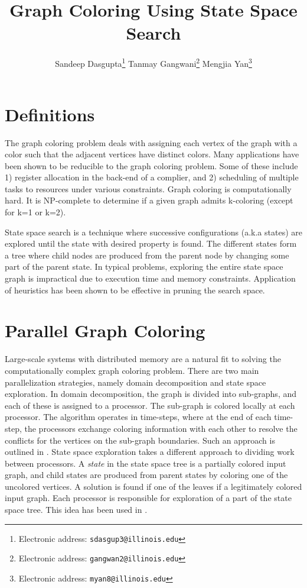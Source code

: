 \documentclass[10pt,twoside]{article}
\title{\textbf{Graph Coloring Using State Space Search}}
\author{Sandeep Dasgupta\thanks{Electronic address: \texttt{sdasgup3@illinois.edu}}
\qquad Tanmay Gangwani\thanks{Electronic address: \texttt{gangwan2@illinois.edu}}
\qquad  Mengjia Yan\thanks{Electronic address:
\texttt{myan8@illinois.edu}}}
\begin{document}
\thispagestyle{empty}

\maketitle
\section{Definitions}
  The graph coloring problem deals with assigning each vertex of the graph with a color such that the adjacent vertices have distinct colors. Many applications have been shown to be reducible to the graph coloring problem. Some of these include 1) register allocation in the back-end of a complier, and 2) scheduling of multiple tasks to resources under various constraints. Graph coloring is computationally hard. It is NP-complete to determine if a given graph admits k-coloring (except for k=1 or k=2).

  State space search is a technique where successive configurations (a.k.a states) are explored until the state with desired property is found. The different states form a tree where child nodes are produced from the parent node by changing some part of the parent state. In typical problems, exploring the entire state space graph is impractical due to execution time and memory constraints. Application of heuristics has been shown to be effective in pruning the search space.

\section{Parallel Graph Coloring}
Large-scale systems with distributed memory are a natural fit to solving the
computationally complex graph coloring problem. There are two main
parallelization strategies, namely domain decomposition and state space
exploration. In domain decomposition, the graph is divided into sub-graphs, and
each of these is assigned to a processor. The sub-graph is colored locally at
each processor. The algorithm operates in time-steps, where at the end of each
time-step, the processors exchange coloring information with each other to
resolve the conflicts for the vertices on the sub-graph boundaries. Such an
approach is outlined in \cite{EuroPar2005}. State space exploration takes a
different approach to dividing work between processors. A \textit{state} in the
state space tree is a partially colored input graph, and child states are
produced from parent states by coloring one of the uncolored vertices. A
solution is found if one of the leaves if a legitimately colored input graph.
Each processor is responsible for exploration of a part of the state space
tree. This idea has been used in \cite{ParSSSEPPL, SearchAAAI90, Kale1995}.
\end{document}
